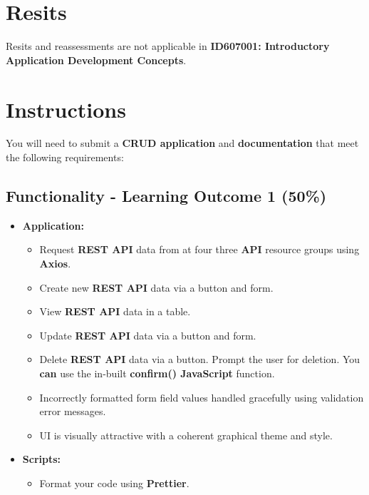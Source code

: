 \documentclass{article}
\begin{document}
\section*{Resits}
Resits and reassessments are not applicable in \textbf{ID607001: Introductory Application Development Concepts}. 
\newpage

\section*{Instructions}
You will need to submit a \textbf{CRUD application} and \textbf{documentation} that meet the following requirements: 

\subsection*{Functionality - Learning Outcome 1 (50\%)}
\begin{itemize}
	\item \textbf{Application:}
		\begin{itemize}
		\item Request \textbf{REST API} data from at four three \textbf{API} resource groups using \textbf{Axios}.
		\item Create new \textbf{REST API} data via a button and form. 
		\item View \textbf{REST API} data in a table.
		\item Update \textbf{REST API} data via a button and form. 
		\item Delete \textbf{REST API} data via a button.
		Prompt the user for deletion. You \textbf{can} use the in-built \textbf{confirm() JavaScript} function. 
		\item Incorrectly formatted form field values handled gracefully using validation error messages.
		\item UI is visually attractive with a coherent graphical theme and style.	
	\end{itemize}
	\item \textbf{Scripts:}
	\begin{itemize}
		\item Format your code using \textbf{Prettier}.
	\end{itemize}
\end{itemize}
\end{document}
